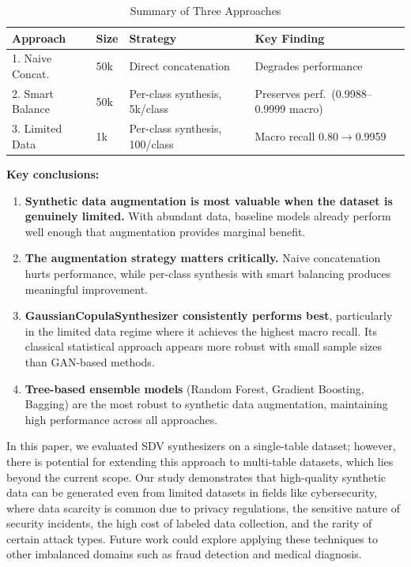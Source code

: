 \documentclass[conference]{IEEEtran}
\begin{document}
\begin{table}[htbp]
\caption{Summary of Three Approaches}
\label{tab:summary}
\centering
\begin{tabular}{p{1.4cm} p{1cm} p{2.2cm} p{2.8cm}}
\toprule
\textbf{Approach} & \textbf{Size} & \textbf{Strategy} & \textbf{Key Finding} \\
\midrule
1. Naive Concat. & 50k & Direct concatenation & Degrades performance \\
2. Smart Balance & 50k & Per-class synthesis, 5k/class & Preserves perf.\ (0.9988--0.9999 macro) \\
3. Limited Data & 1k & Per-class synthesis, 100/class & Macro recall 0.80$\to$0.9959 \\
\bottomrule
\end{tabular}
\end{table}

\textbf{Key conclusions:}
\begin{enumerate}
    \item \textbf{Synthetic data augmentation is most valuable when the dataset is genuinely limited.} With abundant data, baseline models already perform well enough that augmentation provides marginal benefit.
    \item \textbf{The augmentation strategy matters critically.} Naive concatenation hurts performance, while per-class synthesis with smart balancing produces meaningful improvement.
    \item \textbf{GaussianCopulaSynthesizer consistently performs best}, particularly in the limited data regime where it achieves the highest macro recall. Its classical statistical approach appears more robust with small sample sizes than GAN-based methods.
    \item \textbf{Tree-based ensemble models} (Random Forest, Gradient Boosting, Bagging) are the most robust to synthetic data augmentation, maintaining high performance across all approaches.
\end{enumerate}

In this paper, we evaluated SDV synthesizers on a single-table dataset; however, there is potential for extending this approach to multi-table datasets, which lies beyond the current scope. Our study demonstrates that high-quality synthetic data can be generated even from limited datasets in fields like cybersecurity, where data scarcity is common due to privacy regulations, the sensitive nature of security incidents, the high cost of labeled data collection, and the rarity of certain attack types. Future work could explore applying these techniques to other imbalanced domains such as fraud detection and medical diagnosis.
\end{document}
